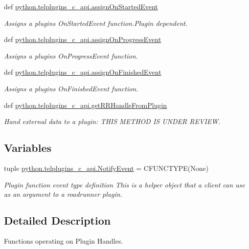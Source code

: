 \begin{DoxyCompactItemize}
def \hyperlink{group__plugins_gafdfeebd9388d22d44fcf4e1ab210172a}{python.\-telplugins\-\_\-c\-\_\-api.\-assign\-On\-Started\-Event}
\begin{DoxyCompactList}\small\item\em Assigns a plugins On\-Started\-Event function.\-Plugin dependent. \end{DoxyCompactList}\item 
def \hyperlink{group__plugins_ga3ffaafb2750775f6a12aca579aeae3eb}{python.\-telplugins\-\_\-c\-\_\-api.\-assign\-On\-Progress\-Event}
\begin{DoxyCompactList}\small\item\em Assigns a plugins On\-Progress\-Event function. \end{DoxyCompactList}\item 
def \hyperlink{group__plugins_ga5b36525c4e4aa07a487743962188d52a}{python.\-telplugins\-\_\-c\-\_\-api.\-assign\-On\-Finished\-Event}
\begin{DoxyCompactList}\small\item\em Assigns a plugins On\-Finished\-Event function. \end{DoxyCompactList}\item 
def \hyperlink{group__plugins_ga4148c2d510b803e0b89195bc0c57b7df}{python.\-telplugins\-\_\-c\-\_\-api.\-get\-R\-R\-Handle\-From\-Plugin}
\begin{DoxyCompactList}\small\item\em Hand external data to a plugin\-: T\-H\-I\-S M\-E\-T\-H\-O\-D I\-S U\-N\-D\-E\-R R\-E\-V\-I\-E\-W. \end{DoxyCompactList}\end{DoxyCompactItemize}
\subsection*{Variables}
\begin{DoxyCompactItemize}
\item 
tuple \hyperlink{group__plugins_ga2a3c0a71c0c5e030bfda4f885e12f104}{python.\-telplugins\-\_\-c\-\_\-api.\-Notify\-Event} = C\-F\-U\-N\-C\-T\-Y\-P\-E(None)
\begin{DoxyCompactList}\small\item\em Plugin function event type definition This is a helper object that a client can use as an argument to a roadrunner plugin. \end{DoxyCompactList}\end{DoxyCompactItemize}


\subsection{Detailed Description}
Functions operating on Plugin Handles. 

